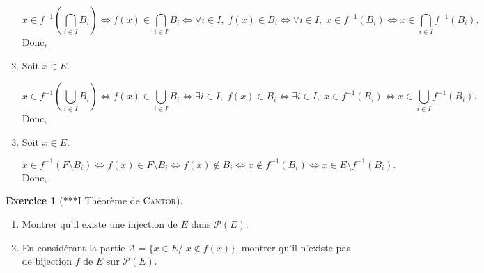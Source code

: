 \documentclass[11pt,a4paper]{article}
\theoremstyle{definition}
\newtheorem{exo}{Exercice}
\newcommand{\exercice}[1]{} \newcommand{\finexercice}{}
\newcommand{\enonce}{\begin{exo}} \newcommand{\finenonce}{\end{exo}}
\newcommand{\noindication}{\stepcounter{ind}}
\begin{document}
\begin{enumerate}
$$x\in f^{-1}\left(\bigcap_{i\in I}B_i\right)\Leftrightarrow f(x)\in\bigcap_{i\in I}B_i\Leftrightarrow\forall i\in I,\;f(x)\in B_i\Leftrightarrow\forall i\in
I,\;x\in f^{-1}(B_i)\Leftrightarrow x\in\bigcap_{i\in I}f^{-1}(B_i).$$
Donc,

\begin{center}
\end{center}

 \item  Soit $x\in E$.

$$x\in f^{-1}(\bigcup_{i\in I}B_i)\Leftrightarrow f(x)\in\bigcup_{i\in I}B_i\Leftrightarrow\exists i\in I,\;f(x)\in B_i\Leftrightarrow\exists i\in
I,\;x\in f^{-1}(B_i)\Leftrightarrow x\in\bigcup_{i\in I}f^{-1}(B_i).$$
Donc,

\begin{center}
\end{center}
 \item  Soit $x\in E$.

$$x\in f^{-1}(F\setminus B_i)\Leftrightarrow f(x)\in F\setminus B_i\Leftrightarrow f(x)\notin B_i\Leftrightarrow x\notin f^{-1}(B_i)\Leftrightarrow x\in
E\setminus f^{-1}(B_i).$$
Donc,

\begin{center}
\end{center}
\end{enumerate}
\fincorrection
\finexercice
\exercice{5117, rouget, 2010/06/30}
\enonce[***I Théorème de \textsc{Cantor}]
\begin{enumerate}
\item   Montrer qu'il existe une injection de $E$ dans $\mathcal{P}(E)$.
\item  En considérant la partie $A=\{x\in E/\;x\notin f(x)\}$, montrer qu'il n'existe pas de bijection $f$ de $E$
sur $\mathcal{P}(E)$.
\end{enumerate}
\finenonce

\noindication
\end{document}
